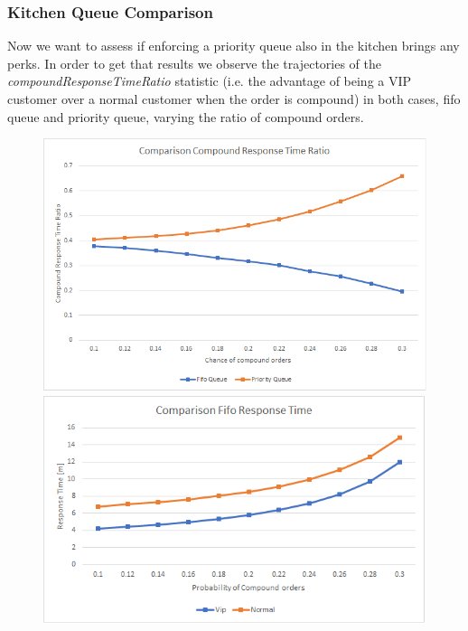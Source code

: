\subsubsection{Kitchen Queue Comparison}

Now we want to assess if enforcing a priority queue also in the kitchen brings any perks. In order to get that results we observe the trajectories of the \emph{compoundResponseTimeRatio} statistic (i.e. the advantage of being a VIP customer over a normal customer when the order is compound) in both cases, fifo queue and priority queue, varying the ratio of compound orders.

\begin{figure}[h!]
    \centering
    \begin{minipage}{0.48\textwidth}
      \includegraphics[width=\textwidth]{figs/comparisonQueue.png}
      \caption{} %
      \label{}
    \end{minipage}\hspace{0.03\textwidth}
    \begin{minipage}{0.48\textwidth}
      \includegraphics[width=\textwidth]{figs/comparisonFifoKitchen.png}
      \caption{} %
      \label{}
    \end{minipage}
\end{figure}

